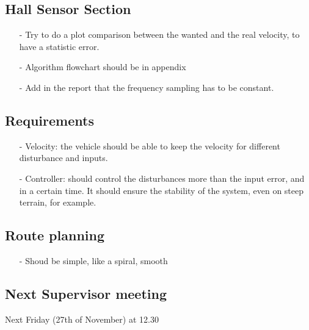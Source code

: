 \subsection{Hall Sensor Section}
\begin{itemize}
\item[-] Try to do a plot comparison between the  wanted and the real velocity, to have a statistic error.
\item[-] Algorithm flowchart should be in appendix
\item[-] Add in the report that the frequency sampling has to be constant.
\end{itemize}

\subsection{Requirements}
\begin{itemize}
\item[-] Velocity: the vehicle should be able to keep the velocity for different disturbance and inputs.
\item[-] Controller: should control the disturbances more than the input error, and in a certain time. It should ensure the stability of the system, even on steep terrain, for example.
\end{itemize}


\subsection{Route planning}
\begin{itemize}
\item[-] Shoud be simple, like a spiral, smooth
\end{itemize}


\subsection{Next Supervisor meeting}
Next Friday (27th of November) at 12.30



